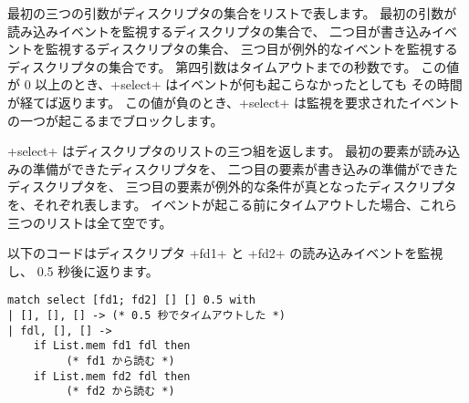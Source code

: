 最初の三つの引数がディスクリプタの集合をリストで表します。
最初の引数が読み込みイベントを監視するディスクリプタの集合で、
二つ目が書き込みイベントを監視するディスクリプタの集合、
三つ目が例外的なイベントを監視するディスクリプタの集合です。
第四引数はタイムアウトまでの秒数です。
この値が 0 以上のとき、\ml+select+ はイベントが何も起こらなかったとしても
その時間が経てば返ります。
この値が負のとき、\ml+select+ は監視を要求されたイベントの一つが起こるまでブロックします。

\ml+select+ はディスクリプタのリストの三つ組を返します。
最初の要素が読み込みの準備ができたディスクリプタを、
二つ目の要素が書き込みの準備ができたディスクリプタを、
三つ目の要素が例外的な条件が真となったディスクリプタを、それぞれ表します。
イベントが起こる前にタイムアウトした場合、これら三つのリストは全て空です。

\begin{example}
以下のコードはディスクリプタ \ml+fd1+ と \ml+fd2+ の読み込みイベントを監視し、 0.5 秒後に返ります。
\begin{lstlisting}
match select [fd1; fd2] [] [] 0.5 with
| [], [], [] -> (* 0.5 秒でタイムアウトした *)
| fdl, [], [] ->
    if List.mem fd1 fdl then
         (* fd1 から読む *)
    if List.mem fd2 fdl then
         (* fd2 から読む *)
\end{lstlisting}
\end{example}

